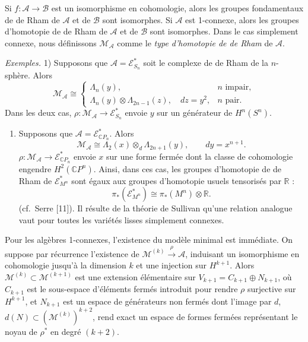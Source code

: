 \documentclass[
  french,
  a3paper,
  a3paper]{extarticle}
\providecommand{\tightlist}{%
  \setlength{\itemsep}{0pt}\setlength{\parskip}{0pt}}
\begin{document}
Si \(f:\mathscr A\to\mathscr B\) est un isomorphisme en cohomologie,
alors les groupes fondamentaux de de Rham de \(\mathscr A\) et de
\(\mathscr B\) sont isomorphes. Si \(\mathscr A\) est 1-connexe, alors
les groupes d'homotopie de de Rham de \(\mathscr A\) et de
\(\mathscr B\) sont isomorphes. Dans le cas simplement connexe, nous
définissons \(\mathcal M_{\mathscr A}\) comme le \emph{type d'homotopie
de de Rham} de \(\mathscr A\).

\emph{Exemples.} 1) Supposons que \(\mathscr A=\mathscr E^*_{S_n}\) soit
le complexe de de Rham de la \(n\)-sphère. Alors \[
\mathcal M_{\mathscr A}\cong
\begin{cases}
\Lambda_n(y),&n\text{ impair},\\
\Lambda_n(y)\otimes\Lambda_{2n-1}(z),\quad dz=y^2,&n\text{ pair}.
\end{cases}
\] Dans les deux cas,
\(\rho:\mathcal M_{\mathscr A}\to\mathscr E^*_{S_n}\) envoie \(y\) sur
un générateur de \(H^n(S^n)\).

\begin{enumerate}
\def\labelenumi{\arabic{enumi})}
\setcounter{enumi}{1}
\tightlist
\item
  Supposons que \(\mathscr A=\mathscr E^*_{\mathbb CP_n}\). Alors \[
  \mathcal M_{\mathscr A}\cong\Lambda_2(x)\otimes_d\Lambda_{2n+1}(y),\qquad dy=x^{n+1}.
  \] \(\rho:\mathcal M_{\mathscr A}\to\mathscr E^*_{\mathbb CP_n}\)
  envoie \(x\) sur une forme fermée dont la classe de cohomologie
  engendre \(H^2(\mathbb CP^n)\). Ainsi, dans ces cas, les groupes
  d'homotopie de de Rham de \(\mathscr E^*_{M^n}\) sont égaux aux
  groupes d'homotopie usuels tensorisés par \(\mathbb R\) : \[
  \pi_*(\mathscr E^*_{M^n})\cong\pi_*(M^n)\otimes\mathbb R.
  \] (cf.~Serre {[}11{]}). Il résulte de la théorie de Sullivan qu'une
  relation analogue vaut pour toutes les variétés lisses simplement
  connexes.
\end{enumerate}

Pour les algèbres 1-connexes, l'existence du modèle minimal est
immédiate. On suppose par récurrence l'existence de
\(\mathcal M^{(k)}\xrightarrow{\rho}\mathscr A\), induisant un
isomorphisme en cohomologie jusqu'à la dimension \(k\) et une injection
sur \(H^{k+1}\). Alors \(\mathcal M^{(k)}\subset\mathcal M^{(k+1)}\) est
une extension élémentaire sur \(V_{k+1}=C_{k+1}\oplus N_{k+1}\), où
\(C_{k+1}\) est le sous-espace d'éléments fermés introduit pour rendre
\(\rho\) surjective sur \(H^{k+1}\), et \(N_{k+1}\) est un espace de
générateurs non fermés dont l'image par \(d\),
\(d(N)\subset(\mathcal M^{(k)})^{k+2}\), rend exact un espace de formes
fermées représentant le noyau de \(\rho^*\) en degré \((k+2)\).
\end{document}
